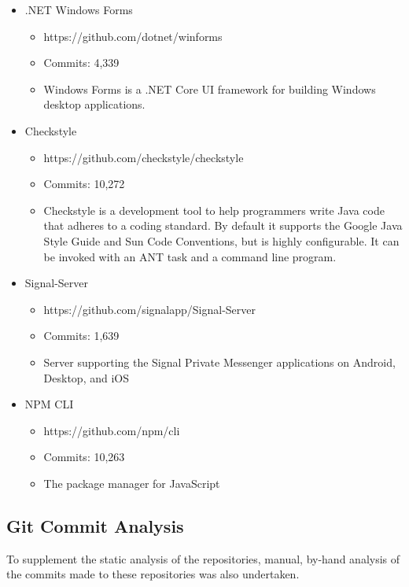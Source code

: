 \documentclass{article}
\begin{document}
            \begin{itemize}
                \item .NET Windows Forms
                \begin{itemize}
                    \item https://github.com/dotnet/winforms
                    \item Commits: 4,339
                    \item Windows Forms is a .NET Core UI framework for building Windows desktop applications.
                \end{itemize}
                \item Checkstyle
                \begin{itemize}
                    \item https://github.com/checkstyle/checkstyle
                    \item Commits: 10,272
                    \item Checkstyle is a development tool to help programmers write Java code that adheres to a coding standard. By default it supports the Google Java Style Guide and Sun Code Conventions, but is highly configurable. It can be invoked with an ANT task and a command line program.
                \end{itemize}
                \item Signal-Server
                \begin{itemize}
                    \item https://github.com/signalapp/Signal-Server
                    \item Commits: 1,639
                    \item Server supporting the Signal Private Messenger applications on Android, Desktop, and iOS
                \end{itemize}
                \item NPM CLI
                \begin{itemize}
                    \item https://github.com/npm/cli
                    \item Commits: 10,263
                    \item The package manager for JavaScript
                \end{itemize}
            \end{itemize}
    \subsection{Git Commit Analysis}
        To supplement the static analysis of the repositories, manual, by-hand analysis of the commits made to these repositories was also undertaken.
\end{document}
